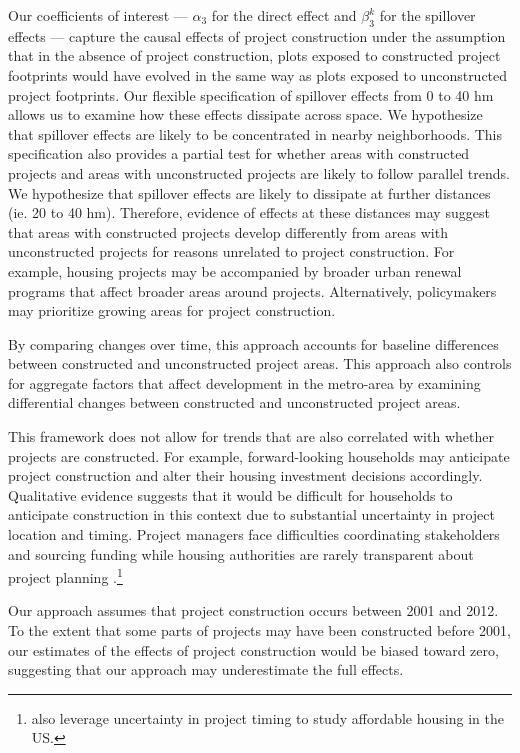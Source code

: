 \documentclass[12pt]{article}
\begin{document}
Our coefficients of interest --- $\alpha_3$ for the direct effect and $\beta_3^{k}$ for the spillover effects --- capture the causal effects of project construction under the assumption that in the absence of project construction, plots exposed to constructed project footprints would have evolved in the same way as plots exposed to unconstructed project footprints.  Our flexible specification of spillover effects from 0 to 40 hm allows us to examine how these effects dissipate across space.  We hypothesize that spillover effects are likely to be concentrated in nearby neighborhoods.  This specification also provides a partial test for whether areas with constructed projects and areas with unconstructed projects are likely to follow parallel trends.  We hypothesize that spillover effects are likely to dissipate at further distances (ie. 20 to 40 hm).  Therefore, evidence of effects at these distances may suggest that areas with constructed projects develop differently from areas with unconstructed projects for reasons unrelated to project construction.  For example, housing projects may be accompanied by broader urban renewal programs that affect broader areas around projects.  Alternatively, policymakers may prioritize growing areas for project construction.

By comparing changes over time, this approach accounts for baseline differences between constructed and unconstructed project areas.  This approach also controls for aggregate factors that affect development in the metro-area by examining differential changes between constructed and unconstructed project areas.  

This framework does not allow for trends that are also correlated with whether projects are constructed.  For example, forward-looking households may anticipate project construction and alter their housing investment decisions accordingly.  Qualitative evidence suggests that it would be difficult for households to anticipate construction in this context due to substantial uncertainty in project location and timing.  Project managers face difficulties coordinating stakeholders and sourcing funding while housing authorities are rarely transparent about project planning \citep{serihistory}.\footnote{\cite{diamond2019wants} also leverage uncertainty in project timing to study affordable housing in the US.} 

Our approach assumes that project construction occurs between 2001 and 2012.  To the extent that some parts of projects may have been constructed before 2001, our estimates of the effects of project construction would be biased toward zero, suggesting that our approach may underestimate the full effects.
\end{document}
